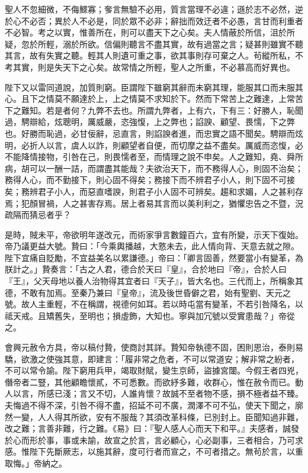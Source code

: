 \begin{pinyinscope}
 聖人不忽細微，不侮鰥寡；奓言無驗不必用，質言當理不必違；遜於志不必然，逆於心不必否；異於人不必是，同於眾不必非；辭拙而效迂者不必愚，言甘而利重者不必智。考之以實，惟善所在，則可以盡天下之心矣。夫人情蔽於所信，沮於所疑，忽於所輕，溺於所欲。信偏則聽言不盡其實，故有過當之言；疑甚則雖實不聽其言，故有失實之聽。輕其人則遺可重之事，欲其事則存可棄之人。茍縱所私，不考其實，則是失天下之心矣。故常情之所輕，聖人之所重，不必慕高而好異也。



 陛下又以雷同道說，加質則窮。臣謂陛下雖窮其辭而未窮其理，能服其口而未服其心。且下之情莫不願達於上，上之情莫不求知於下。然而下常苦上之難達，上常苦下之難知。若是者何？九弊不去也。所謂九弊者，上有六，下有三：好勝人，恥聞過，騁辯給，炫聰明，厲威嚴，恣強愎，上之弊也；諂諛、顧望、畏懦，下之弊也。好勝而恥過，必甘佞辭，忌直言，則諂諛者進，而忠實之語不聞矣。騁辯而炫明，必折人以言，虞人以詐，則顧望者自便，而切摩之益不盡矣。厲威而恣愎，必不能降情接物，引咎在己，則畏懦者至，而情理之說不申矣。人之難知，堯、舜所病，胡可以一酬一詰，而謂盡其能哉？夫欲治天下，而不務得人心，則固不治矣；務得人心，而不勤接下，則心固不得矣；務接下而不辨君子小人，則下固不可接矣；務辨君子小人，而惡直嗜諛，則君子小人固不可辨矣。趨和求媚，人之甚利存焉；犯顏冒禍，人之甚害存焉。居上者易其言而以美利利之，猶懼忠告之不暨，況疏隔而猜忌者乎？



 是時，賊未平，帝欲明年遂改元，而術家爭言數鐘百六，宜有所變，示天下復始。帝乃議更益大號。贄曰：「今乘輿播越，大憝未去，此人情向背、天意去就之隙。陛下宜痛自貶勵，不宜益美名以累謙德。」帝曰：「卿言固善，然要當小有變革，為朕計之。」贄奏言：「古之人君，德合於天曰『皇』，合於地曰『帝』，合於人曰『王』，父天母地以養人治物得其宜者曰『天子』，皆大名也。三代而上，所稱象其德，不敢有加焉。至秦乃兼曰『皇帝』，流及後世昏僻之君，始有聖劉、天元之號。故人主重輕，不在稱謂，視德何如耳。若以時屯當有變革，不若引咎降名，以祗天戒。且矯舊失，至明也；損虛飾，大知也。寧與加冗號以受實患哉？」帝從之。



 會興元赦令方具，帝以稿付贄，使商討其詳。贄知帝執德不固，困則思治，泰則易驕，欲激之使強其意，即建言：「履非常之危者，不可以常道安；解非常之紛者，不可以常令諭。陛下窮用兵甲，竭取財賦，變生京師，盜據宮闥。今假王者四兇，僭帝者二豎，其他顧瞻懷貳，不可悉數。而欲紓多難，收群心，惟在赦令而已。動人以言，所感已淺；言又不切，人誰肯懷？故誠不至者物不感，損不極者益不臻。夫悔過不得不深，引咎不得不盡，招延不可不廣，潤澤不可不弘，使天下聞之，廓然一變，人人得其所欲，安有不服哉？其須改革科條，已別封上。臣聞知過非難，改之難；言善非難，行之難。《易》曰：『聖人感人心而天下和平。』夫感者，誠發於心而形於事，事或未諭，故宣之於言，言必顧心，心必副事，三者相合，乃可求感。惟陛下先斷厥志，以施其辭，度可行者而宣之，不可者措之。無茍於言，以重取悔。」帝納之。




\end{pinyinscope}
